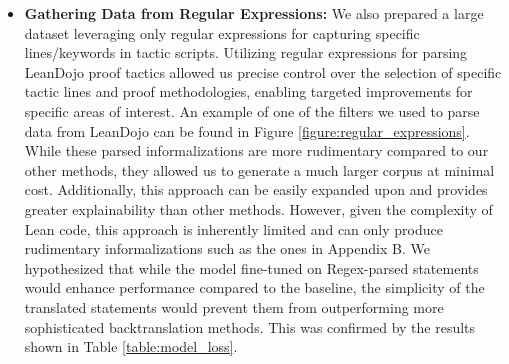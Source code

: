 \documentclass{article} %
\begin{document}
\begin{itemize}
\begin{enumerate}
     
    \item Our second method focuses on informalizing not only the theorem statement but also each individual tactic within a proof. This approach tests whether detailed explanations of each tactic can enhance the overall understanding of the proof. Utilizing the LeanDojo dataset \cite{Leandojo}, which is pre-parsed into distinct tactics, our prompts included the formal theorem statement and the states of the proof both before and after each tactic is applied. We employed a zero-shot prompting strategy with tuples of (stateBefore, tactic, stateAfter) to generate a dataset of individually translated tactics, aiming to improve translations between the complete Lean theorem and its natural language counterpart. \label{methods:indivLines}
\end{enumerate}

\item \textbf{Gathering Data from Regular Expressions:} We also prepared a large dataset leveraging only regular expressions for capturing specific lines/keywords in tactic scripts. Utilizing regular expressions for parsing LeanDojo proof tactics allowed us precise control over the selection of specific tactic lines and proof methodologies, enabling targeted improvements for specific areas of interest. An example of one of the filters we used to parse data from LeanDojo can be found in Figure \ref{figure:regular_expressions}. While these parsed informalizations are more rudimentary compared to our other methods, they allowed us to generate a much larger corpus at minimal cost. Additionally, this approach can be easily expanded upon and provides greater explainability than other methods. However, given the complexity of Lean code, this approach is inherently limited and can only produce rudimentary informalizations such as the ones in Appendix B. We hypothesized that while the model fine-tuned on Regex-parsed statements would enhance performance compared to the baseline, the simplicity of the translated statements would prevent them from outperforming more sophisticated backtranslation methods. This was confirmed by the results shown in Table \ref{table:model_loss}.
\end{itemize}
\end{document}
